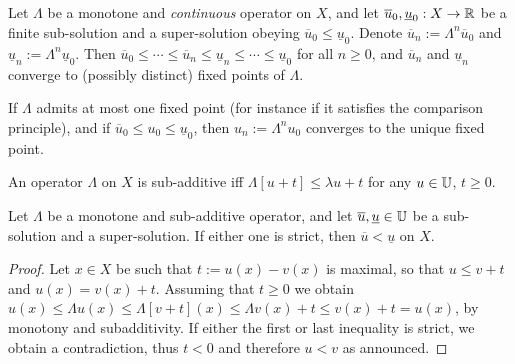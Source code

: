 
\begin{proposition}
Let $\Lambda$ be a monotone and \emph{continuous} operator on $X$, and let $\overline u_0, \underline u_0 : X \to \mathbb{R}$ be a finite sub-solution and a super-solution  obeying $\overline u_0 \leq \underline u_0$. Denote $\overline u_n := \Lambda^n \overline u_0$ and $\underline u_n := \Lambda^n \underline u_0$.
Then $\overline u_0 \leq \cdots \leq \overline u_n \leq \underline u_n \leq \cdots \leq \underline u_0$ for all $n \geq 0$, and $\overline u_n$ and $\underline u_n$ converge to (possibly distinct) fixed points of $\Lambda$. 	

If $\Lambda$ admits at most one fixed point (for instance if it satisfies the comparison principle), and if $\overline u_0 \leq u_0 \leq \underline u_0$, then $u_n := \Lambda^n u_0$ converges to the unique fixed point.  
\end{proposition}


\begin{definition}
	An operator $\Lambda$ on $X$ is sub-additive iff $\Lambda [u+t] \leq \lambda u + t$ for any $u \in \mathbb{U}$, $t \geq 0$. 
\end{definition}


\begin{proposition}
\label{prop:comparison}
	Let $\Lambda$ be a monotone and sub-additive operator, and let $\overline u, \underline u \in \mathbb{U}$ be a sub-solution and a super-solution. If either one is strict, then $\overline u < \underline u$ on $X$.
\end{proposition}


\begin{proof}
	Let $x \in X$ be such that $t:=u(x)-v(x)$ is maximal, so that $u \leq v+t$ and $u(x) = v(x)+t$. Assuming that $t \geq 0$ we obtain $u(x)\leq \Lambda u(x) \leq \Lambda [v+t](x) \leq \Lambda v(x) +t \leq v(x)+t = u(x)$, by monotony and subadditivity. If either the first or last inequality is strict, we obtain a contradiction, thus $t<0$ and therefore $u<v$ as announced.
\end{proof}

